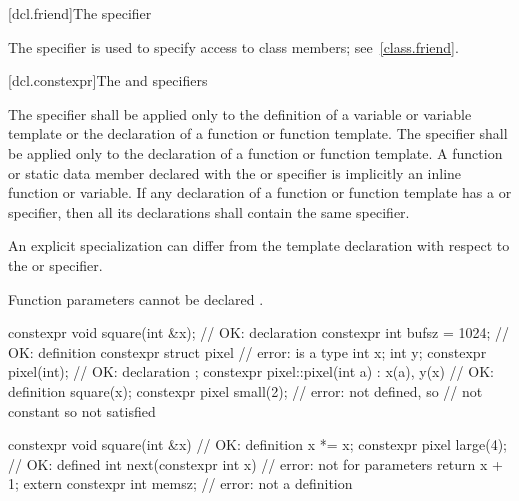 [dcl.friend]{The  specifier}%

\pnum
The  specifier is used to specify access to class members;
see~\ref{class.friend}.

[dcl.constexpr]{The  and  specifiers}%

\pnum
The  specifier shall be applied only to
the definition of a variable or variable template or
the declaration of a function or function template.
The  specifier shall be applied only to
the declaration of a function or function template.
A function or static data member
declared with the  or  specifier
is implicitly an inline function or variable.
If any declaration of a function or function template has
a  or  specifier,
then all its declarations shall contain the same specifier.
\begin{note}
An explicit specialization can differ from the template declaration
with respect to the  or  specifier.
\end{note}
\begin{note}
Function parameters cannot be declared .
\end{note}
\begin{example}
\begin{codeblock}
constexpr void square(int &x);  // OK: declaration
constexpr int bufsz = 1024;     // OK: definition
constexpr struct pixel {        // error:  is a type
  int x;
  int y;
  constexpr pixel(int);         // OK: declaration
};
constexpr pixel::pixel(int a)
  : x(a), y(x)                  // OK: definition
  { square(x); }
constexpr pixel small(2);       // error:  not defined, so 
                                // not constant so  not satisfied

constexpr void square(int &x) { // OK: definition
  x *= x;
}
constexpr pixel large(4);       // OK:  defined
int next(constexpr int x) {     // error: not for parameters
     return x + 1;
}
extern constexpr int memsz;     // error: not a definition
\end{codeblock}
\end{example}

